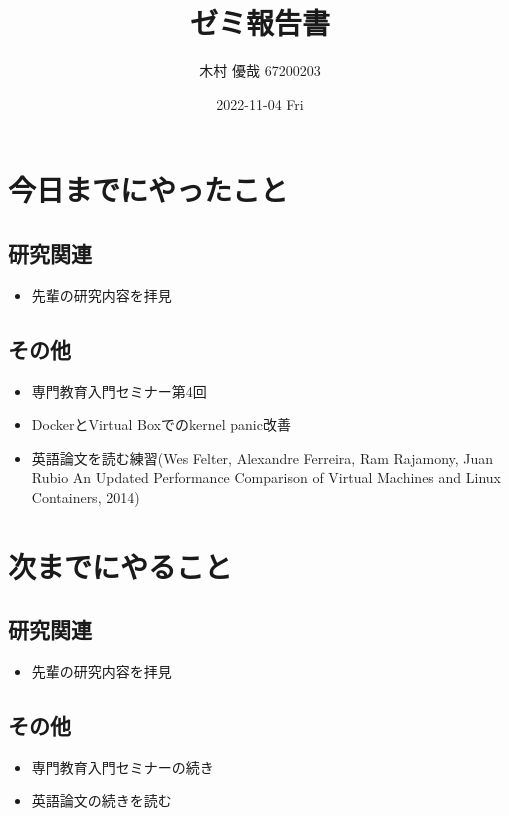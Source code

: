 \documentclass[uplatex, onecolumn, 10pt]{jsarticle}
\begin{document}
\title{\vspace{-40mm}\bf{\LARGE{ゼミ報告書}}}
\author{\vspace{-40mm}木村 優哉 67200203}
\date{2022-11-04 Fri}
\maketitle


\section{今日までにやったこと}

\subsection*{研究関連} 
\begin{itemize}
	\item 先輩の研究内容を拝見
\end{itemize}

\subsection*{その他}
\begin{itemize}
	\item 専門教育入門セミナー第4回
	\item DockerとVirtual Boxでのkernel panic改善
	\item 英語論文を読む練習(Wes Felter, Alexandre Ferreira, Ram Rajamony, Juan Rubio 
	An Updated Performance Comparison of Virtual Machines and Linux Containers, 2014)
\end{itemize}


\section{次までにやること}

\subsection*{研究関連} 
\begin{itemize}
	\item 先輩の研究内容を拝見
\end{itemize}

\subsection*{その他}
\begin{itemize}
	\item 専門教育入門セミナーの続き
	\item 英語論文の続きを読む
\end{itemize}
\end{document}
